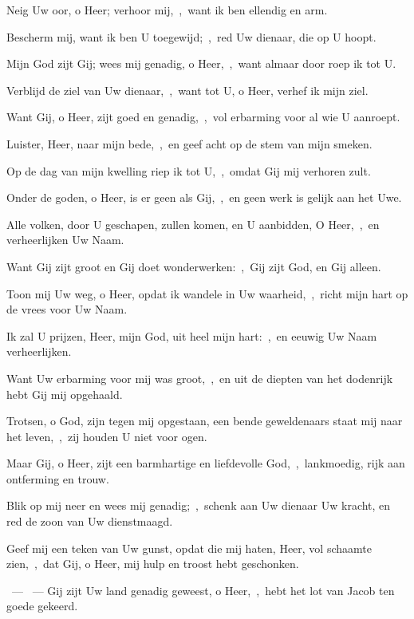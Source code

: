 \documentclass[12pt,twoside,a5paper]{article}
\begin{document}
\begin{halfparskip}
   Neig Uw oor, o Heer; verhoor mij,~\sep\ want ik ben ellendig en arm.

  Bescherm mij, want ik ben U toegewijd;~\sep\ red Uw dienaar, die op U hoopt.

  Mijn God zijt Gij; wees mij genadig, o Heer,~\sep\ want almaar door roep ik tot U.

  Verblijd de ziel van Uw dienaar,~\sep\ want tot U, o Heer, verhef ik mijn ziel.

  Want Gij, o Heer, zijt goed en genadig,~\sep\ vol erbarming voor al wie U aanroept.

  Luister, Heer, naar mijn bede,~\sep\ en geef acht op de stem van mijn smeken.

  Op de dag van mijn kwelling riep ik tot U,~\sep\ omdat Gij mij verhoren zult.

  Onder de goden, o Heer, is er geen als Gij,~\sep\ en geen werk is gelijk aan het Uwe.

  Alle volken, door U geschapen, zullen komen, en U aanbidden, O Heer,~\sep\ en verheerlijken Uw Naam.

  Want Gij zijt groot en Gij doet wonderwerken:~\sep\ Gij zijt God, en Gij alleen.

  Toon mij Uw weg, o Heer, opdat ik wandele in Uw waarheid,~\sep\ richt mijn hart op de vrees voor Uw Naam.

  Ik zal U prijzen, Heer, mijn God, uit heel mijn hart:~\sep\ en eeuwig Uw Naam verheerlijken.

  Want Uw erbarming voor mij was groot,~\sep\ en uit de diepten van het dodenrijk hebt Gij mij opgehaald.

  Trotsen, o God, zijn tegen mij opgestaan, een bende geweldenaars staat mij naar het leven,~\sep\ zij houden U niet voor ogen.

  Maar Gij, o Heer, zijt een barmhartige en liefdevolle God,~\sep\ lankmoedig, rijk aan ontferming en trouw.

  Blik op mij neer en wees mij genadig;~\sep\ schenk aan Uw dienaar Uw kracht, en red de zoon van Uw
  dienstmaagd.

  Geef mij een teken van Uw gunst, opdat die mij haten, Heer, vol schaamte zien,~\sep\ dat Gij, o Heer, mij hulp en troost hebt geschonken.
\end{halfparskip}

\begin{halfparskip}
  ~--- ~---  Gij zijt Uw land genadig geweest, o Heer,~\sep\ hebt het lot van Jacob ten goede gekeerd.
\end{halfparskip}
\end{document}
